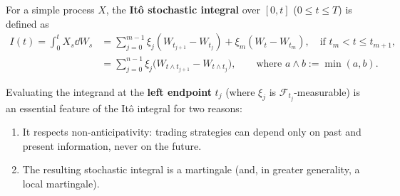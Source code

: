 For a simple process $X$, the \textbf{It\^o stochastic integral} over $[0, t]$ ($0 \le t \le T$) is defined as
\begin{align*}
I(t) = \int_0^t X_s \dd W_s
&= \sum_{j=0}^{m-1} \xi_j (W_{t_{j+1}} - W_{t_j}) + \xi_m (W_t - W_{t_m}), \quad \text{if } t_m < t \le t_{m+1}, \\
&= \sum_{j=0}^{n-1} \xi_j \big(W_{t \wedge t_{j+1}} - W_{t \wedge t_j}\big), \qquad \text{where } a \wedge b := \min(a, b).
\end{align*}

Evaluating the integrand at the \textbf{left endpoint} $t_j$ (where $\xi_j$ is $\mathcal{F}_{t_j}$-measurable) is an essential feature of the It\^o integral for two reasons:
\begin{enumerate}
    \item It respects non-anticipativity: trading strategies can depend only on past and present information, never on the future.
    \item The resulting stochastic integral is a martingale (and, in greater generality, a local martingale).
\end{enumerate}


